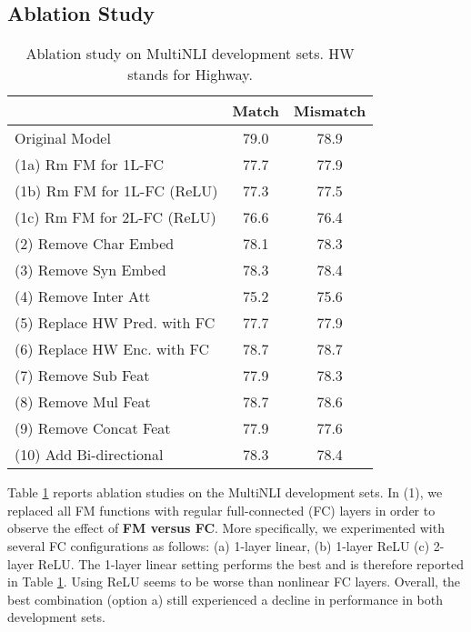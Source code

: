 \documentclass[11pt,a4paper]{article}
\begin{document}
\subsection{Ablation Study}
\begin{table}[htbp]
  \centering
  \small

    \begin{tabular}{|p{4cm}|cc|}
    \hline
          & \multicolumn{1}{l}{Match} & \multicolumn{1}{l|}{Mismatch} \\
          \hline
    Original Model & 79.0    & 78.9 \\
    \hline
    (1a) Rm FM for 1L-FC & 77.7  & 77.9 \\
(1b) Rm FM for 1L-FC (ReLU) & 77.3  & 77.5 \\
    (1c) Rm FM for 2L-FC (ReLU) & 76.6  & 76.4 \\
    \hline
    (2) Remove Char Embed & 78.1  & 78.3 \\
        (3) Remove Syn Embed & 78.3  & 78.4 \\
    (4) Remove Inter Att & 75.2  & 75.6 \\
(5) Replace HW Pred. with FC & 77.7  & 77.9 \\
    (6) Replace HW Enc. with FC & 78.7  & 78.7 \\
    (7) Remove Sub Feat & 77.9  & 78.3 \\
    (8) Remove Mul Feat & 78.7  & 78.6 \\
    (9) Remove Concat Feat & 77.9  & 77.6 \\
    (10) Add Bi-directional & 78.3  & 78.4 \\
    \hline
    \end{tabular}\caption{Ablation study on MultiNLI development sets. HW stands for Highway.}
  \label{tab:ablation}\end{table}Table \ref{tab:ablation} reports ablation studies on the MultiNLI development sets. In (1), we replaced all FM functions with regular full-connected (FC) layers in order to observe the effect of \textbf{FM versus FC}. More specifically, we experimented with several FC configurations as follows: (a) 1-layer linear, (b) 1-layer ReLU (c) 2-layer ReLU. The 1-layer linear setting performs the best and is therefore reported in Table \ref{tab:ablation}. Using ReLU seems to be worse than nonlinear FC layers. Overall, the best combination (option a) still experienced a decline in performance in both development sets.
\end{document}
